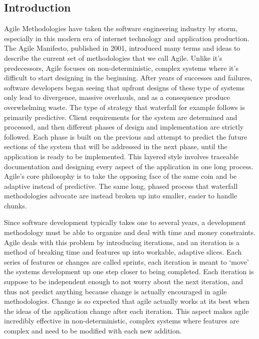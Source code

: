 \documentclass[11pt]{article}
\newcommand{\tab}{\hspace*{2em}}
\begin{document}
\begin{doublespace}

\section{Introduction}

\tab Agile Methodologies have taken the software engineering industry by storm, especially in this modern era of internet technology and application production. The Agile Manifesto, published in 2001, introduced many terms and ideas to describe the current set of methodologies that we call Agile. Unlike it's predecessors, Agile focuses on non-deterministic, complex systems where it’s difficult to start designing in the beginning. After years of successes and failures, software developers began seeing that upfront designs of these type of systems only lead to divergence, massive overhauls, and as a consequence produce overwhelming waste. The type of strategy that waterfall for example follows is primarily predictive. Client requirements for the system are determined and processed, and then different phases of design and implementation are strictly followed. Each phase is built on the previous and attempt to predict the future sections of the system that will be addressed in the next phase, until the application is ready to be implemented. This layered style involves traceable documentation and designing every aspect of the application in one long process. Agile’s core philosophy is to take the opposing face of the same coin and be adaptive instead of predictive. The same long, phased process that waterfall methodologies advocate are instead broken up into smaller, easier to handle chunks. 
 
\tab Since software development typically takes one to several years, a development methodology must be able to organize and deal with time and money constraints. Agile deals with this problem by introducing iterations, and an iteration is a method of breaking time and features up into workable, adaptive slices. Each series of features or changes are called sprints, each iteration is meant to ‘move’ the systems development up one step closer to being completed. Each iteration is suppose to be independent enough to not worry about the next iteration, and thus not predict anything because change is actually encouraged in agile methodologies. Change is so expected that agile actually works at its best when the ideas of the application change after each iteration. This aspect makes agile incredibly effective in non-deterministic, complex systems where features are complex and need to be modified with each new addition.
    

\end{doublespace}
\end{document}
